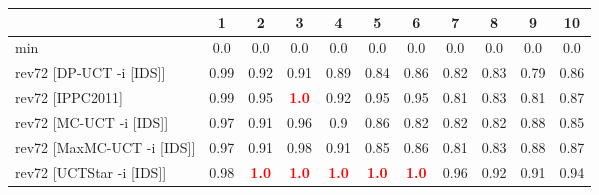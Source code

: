 \documentclass{article}
\begin{document}
\begin{tabular}{|l|r@{$\pm$}rr@{$\pm$}rr@{$\pm$}rr@{$\pm$}rr@{$\pm$}rr@{$\pm$}rr@{$\pm$}rr@{$\pm$}rr@{$\pm$}rr@{$\pm$}r|}
\hline

& \multicolumn{2}{c}{1}
& \multicolumn{2}{c}{2}
& \multicolumn{2}{c}{3}
& \multicolumn{2}{c}{4}
& \multicolumn{2}{c}{5}
& \multicolumn{2}{c}{6}
& \multicolumn{2}{c}{7}
& \multicolumn{2}{c}{8}
& \multicolumn{2}{c}{9}
& \multicolumn{2}{c|}{10}
\\
\hline
\hline
min
& \multicolumn{2}{c}{0.0}
& \multicolumn{2}{c}{0.0}
& \multicolumn{2}{c}{0.0}
& \multicolumn{2}{c}{0.0}
& \multicolumn{2}{c}{0.0}
& \multicolumn{2}{c}{0.0}
& \multicolumn{2}{c}{0.0}
& \multicolumn{2}{c}{0.0}
& \multicolumn{2}{c}{0.0}
& \multicolumn{2}{c|}{0.0}
\\
rev72 [DP-UCT -i [IDS]]
& \multicolumn{2}{c}{0.99}
& \multicolumn{2}{c}{0.92}
& \multicolumn{2}{c}{0.91}
& \multicolumn{2}{c}{0.89}
& \multicolumn{2}{c}{0.84}
& \multicolumn{2}{c}{0.86}
& \multicolumn{2}{c}{0.82}
& \multicolumn{2}{c}{0.83}
& \multicolumn{2}{c}{0.79}
& \multicolumn{2}{c|}{0.86}
\\
rev72 [IPPC2011]
& \multicolumn{2}{c}{0.99}
& \multicolumn{2}{c}{0.95}
& \multicolumn{2}{c}{\textbf{\textcolor{red}{1.0}}}
& \multicolumn{2}{c}{0.92}
& \multicolumn{2}{c}{0.95}
& \multicolumn{2}{c}{0.95}
& \multicolumn{2}{c}{0.81}
& \multicolumn{2}{c}{0.83}
& \multicolumn{2}{c}{0.81}
& \multicolumn{2}{c|}{0.87}
\\
rev72 [MC-UCT -i [IDS]]
& \multicolumn{2}{c}{0.97}
& \multicolumn{2}{c}{0.91}
& \multicolumn{2}{c}{0.96}
& \multicolumn{2}{c}{0.9}
& \multicolumn{2}{c}{0.86}
& \multicolumn{2}{c}{0.82}
& \multicolumn{2}{c}{0.82}
& \multicolumn{2}{c}{0.82}
& \multicolumn{2}{c}{0.88}
& \multicolumn{2}{c|}{0.85}
\\
rev72 [MaxMC-UCT -i [IDS]]
& \multicolumn{2}{c}{0.97}
& \multicolumn{2}{c}{0.91}
& \multicolumn{2}{c}{0.98}
& \multicolumn{2}{c}{0.91}
& \multicolumn{2}{c}{0.85}
& \multicolumn{2}{c}{0.86}
& \multicolumn{2}{c}{0.81}
& \multicolumn{2}{c}{0.83}
& \multicolumn{2}{c}{0.88}
& \multicolumn{2}{c|}{0.87}
\\
rev72 [UCTStar -i [IDS]]
& \multicolumn{2}{c}{0.98}
& \multicolumn{2}{c}{\textbf{\textcolor{red}{1.0}}}
& \multicolumn{2}{c}{\textbf{\textcolor{red}{1.0}}}
& \multicolumn{2}{c}{\textbf{\textcolor{red}{1.0}}}
& \multicolumn{2}{c}{\textbf{\textcolor{red}{1.0}}}
& \multicolumn{2}{c}{\textbf{\textcolor{red}{1.0}}}
& \multicolumn{2}{c}{0.96}
& \multicolumn{2}{c}{0.92}
& \multicolumn{2}{c}{0.91}
& \multicolumn{2}{c|}{0.94}

\end{tabular}
\end{document}
